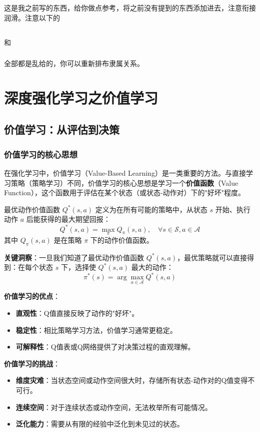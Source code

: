 这是我之前写的东西，给你做点参考，将之前没有提到的东西添加进去，注意衔接润滑。注意以下的\section{}和\subsection{}全部都是乱给的，你可以重新排布隶属关系。

\chapter{深度强化学习之价值学习}
\section{价值学习：从评估到决策}

\subsection{价值学习的核心思想}

在强化学习中，价值学习（Value-Based Learning）是一类重要的方法。与直接学习策略（策略学习）不同，价值学习的核心思想是学习一个\textbf{价值函数}（Value Function），这个函数用于评估在某个状态（或状态-动作对）下的"好坏"程度。

\begin{definition}[最优动作价值函数]
最优动作价值函数 $Q^*(s, a)$ 定义为在所有可能的策略中，从状态 $s$ 开始、执行动作 $a$ 后能获得的最大期望回报：
\[
Q^*(s, a) = \max_{\pi} Q_{\pi}(s, a), \quad \forall s \in \mathcal{S}, a \in \mathcal{A}
\]
其中 $Q_{\pi}(s, a)$ 是在策略 $\pi$ 下的动作价值函数。
\end{definition}

\textbf{关键洞察}：一旦我们知道了最优动作价值函数 $Q^*(s, a)$，最优策略就可以直接得到：在每个状态 $s$ 下，选择使 $Q^*(s, a)$ 最大的动作：
\[
\pi^*(s) = \arg\max_{a \in \mathcal{A}} Q^*(s, a)
\]

\textbf{价值学习的优点}：
\begin{itemize}
    \item \textbf{直观性}：Q值直接反映了动作的"好坏"。
    \item \textbf{稳定性}：相比策略学习方法，价值学习通常更稳定。
    \item \textbf{可解释性}：Q值表或Q网络提供了对决策过程的直观理解。
\end{itemize}

\textbf{价值学习的挑战}：
\begin{itemize}
    \item \textbf{维度灾难}：当状态空间或动作空间很大时，存储所有状态-动作对的Q值变得不可行。
    \item \textbf{连续空间}：对于连续状态或动作空间，无法枚举所有可能情况。
    \item \textbf{泛化能力}：需要从有限的经验中泛化到未见过的状态。
\end{itemize}

